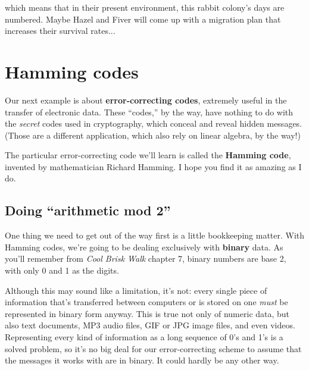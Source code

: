 \begin{alttitles}

which means that in their present environment, this rabbit colony's days are
numbered. Maybe Hazel and Fiver will come up with a migration plan that
increases their survival rates...

\vfill

\pagebreak

\renewcommand{\thesubsection}{H\arabic{subsection}.}%
\section{Hamming codes}


Our next example is about \textbf{error-correcting codes}, extremely useful in
the transfer of electronic data. These ``codes,'' by the way, have nothing to
do with the \textit{secret} codes used in cryptography, which conceal and
reveal hidden messages. (Those are a different application, which also rely on
linear algebra, by the way!)

The particular error-correcting code we'll learn is called the \textbf{Hamming
code}, invented by mathematician Richard Hamming. I hope you find it as amazing
as I do.

\subsection{Doing ``arithmetic mod 2''}


One thing we need to get out of the way first is a little bookkeeping matter.
With Hamming codes, we're going to be dealing exclusively with \textbf{binary}
data. As you'll remember from \textit{Cool Brisk Walk} chapter 7, binary
numbers are base 2, with only 0 and 1 as the digits.


Although this may sound like a limitation, it's not: every single piece of
information that's transferred between computers or is stored on one
\textit{must} be represented in binary form anyway. This is true not only of
numeric data, but also text documents, MP3 audio files, GIF or JPG image files,
and even videos. Representing every kind of information as a long sequence of
0's and 1's is a solved problem, so it's no big deal for our error-correcting
scheme to assume that the messages it works with are in binary. It could hardly
be any other way.


\end{alttitles}
